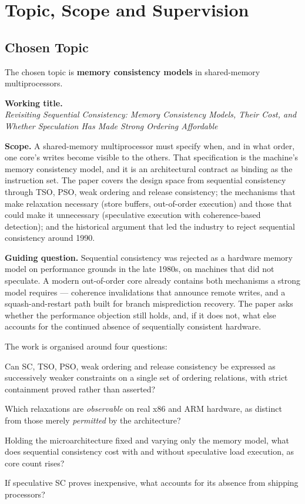 \section{Topic, Scope and Supervision}

\subsection{Chosen Topic}

The chosen topic is \textbf{memory consistency models} in shared-memory
multiprocessors.

\medskip
\noindent\textbf{Working title.}\\
\emph{Revisiting Sequential Consistency: Memory Consistency Models, Their Cost,
and Whether Speculation Has Made Strong Ordering Affordable}

\medskip
\noindent\textbf{Scope.}
A shared-memory multiprocessor must specify when, and in what order, one core's
writes become visible to the others.
That specification is the machine's memory consistency model, and it is an
architectural contract as binding as the instruction set.
The paper covers the design space from sequential consistency through TSO, PSO,
weak ordering and release consistency; the mechanisms that make relaxation
necessary (store buffers, out-of-order execution) and those that could make it
unnecessary (speculative execution with coherence-based detection); and the
historical argument that led the industry to reject sequential consistency
around 1990.

\medskip
\noindent\textbf{Guiding question.}
Sequential consistency was rejected as a hardware memory model on performance
grounds in the late 1980s, on machines that did not speculate.
A modern out-of-order core already contains both mechanisms a strong model
requires --- coherence invalidations that announce remote writes, and a
squash-and-restart path built for branch misprediction recovery.
The paper asks whether the performance objection still holds, and, if it does
not, what else accounts for the continued absence of sequentially consistent
hardware.

\medskip
\noindent The work is organised around four questions:

\begin{description}[leftmargin=2.2cm,style=nextline,font=\normalfont\bfseries]
\item[Q1 Formal] Can SC, TSO, PSO, weak ordering and release consistency be
  expressed as successively weaker constraints on a single set of ordering
  relations, with strict containment proved rather than asserted?
\item[Q2 Empirical] Which relaxations are \emph{observable} on real x86 and ARM
  hardware, as distinct from those merely \emph{permitted} by the architecture?
\item[Q3 Quantitative] Holding the microarchitecture fixed and varying only the
  memory model, what does sequential consistency cost with and without
  speculative load execution, as core count rises?
\item[Q4 Interpretive] If speculative SC proves inexpensive, what accounts for
  its absence from shipping processors?
\end{description}

